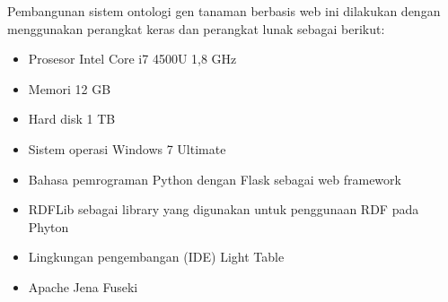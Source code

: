 Pembangunan sistem ontologi gen tanaman berbasis web ini dilakukan dengan menggunakan perangkat keras dan perangkat lunak sebagai berikut:

\begin{itemize}
	\item Prosesor Intel Core i7 4500U 1,8 GHz
	\item Memori 12 GB
	\item Hard disk 1 TB
	\item Sistem operasi Windows 7 Ultimate
	\item Bahasa pemrograman Python dengan Flask sebagai web framework
	\item RDFLib sebagai library yang digunakan untuk penggunaan RDF pada Phyton
	\item Lingkungan pengembangan (IDE) Light Table
	\item Apache Jena Fuseki
\end{itemize}